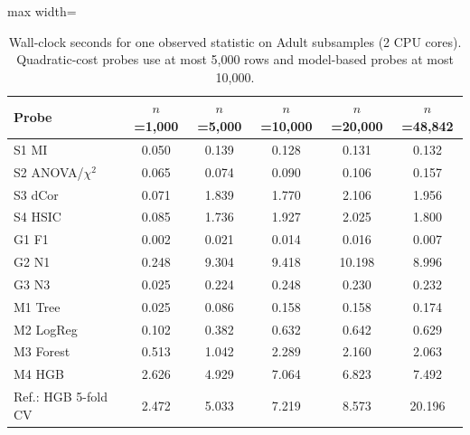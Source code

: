 \begin{table}[!t]
\centering
\caption{Wall-clock seconds for one observed statistic on Adult subsamples (2 CPU cores). Quadratic-cost probes use at most 5{,}000 rows and model-based probes at most 10{,}000.}
\label{tab:runtime}
\footnotesize
\begin{adjustbox}{max width=\linewidth}
\begin{tabular}{lccccc}
\hline
Probe & $n$=1,000 & $n$=5,000 & $n$=10,000 & $n$=20,000 & $n$=48,842 \\ \hline
S1 MI & 0.050 & 0.139 & 0.128 & 0.131 & 0.132 \\
S2 ANOVA/$\chi^2$ & 0.065 & 0.074 & 0.090 & 0.106 & 0.157 \\
S3 dCor & 0.071 & 1.839 & 1.770 & 2.106 & 1.956 \\
S4 HSIC & 0.085 & 1.736 & 1.927 & 2.025 & 1.800 \\
G1 F1 & 0.002 & 0.021 & 0.014 & 0.016 & 0.007 \\
G2 N1 & 0.248 & 9.304 & 9.418 & 10.198 & 8.996 \\
G3 N3 & 0.025 & 0.224 & 0.248 & 0.230 & 0.232 \\
M1 Tree & 0.025 & 0.086 & 0.158 & 0.158 & 0.174 \\
M2 LogReg & 0.102 & 0.382 & 0.632 & 0.642 & 0.629 \\
M3 Forest & 0.513 & 1.042 & 2.289 & 2.160 & 2.063 \\
M4 HGB & 2.626 & 4.929 & 7.064 & 6.823 & 7.492 \\
Ref.: HGB 5-fold CV & 2.472 & 5.033 & 7.219 & 8.573 & 20.196 \\
\hline
\end{tabular}
\end{adjustbox}
\end{table}
